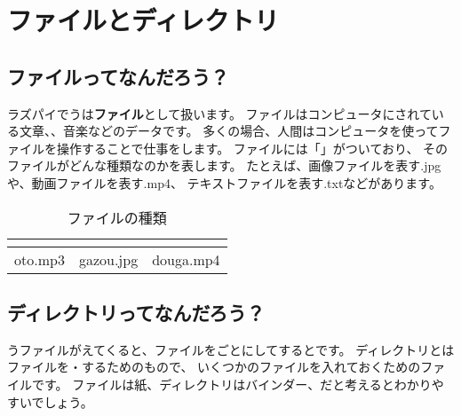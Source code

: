 \newpage
\section{ファイルとディレクトリ}
\subsection{ファイルってなんだろう？}
ラズパイでうは{\bf ファイル}として扱います。
ファイルはコンピュータにされている文章、、音楽などのデータです。
多くの場合、人間はコンピュータを使ってファイルを操作することで仕事をします。
ファイルには「」がついており、
そのファイルがどんな種類なのかを表します。
たとえば、画像ファイルを表す.jpgや、動画ファイルを表す.mp4、
テキストファイルを表す.txtなどがあります。


\begin{table}[H]
  \begin{center}
    \caption[tab:files]{ファイルの種類}
    \begin{tabular}{|c|c|c|} \hline
    \begin{minipage}{0.12\hsize}
      \begin{center}
        
      \end{center}  
    \end{minipage} & 
    \begin{minipage}{0.12\hsize}
      \begin{center}
        
      \end{center}
    \end{minipage} &
    \begin{minipage}{0.12\hsize}
      \begin{center}
        
      \end{center} 
    \end{minipage} \\ \hline
    oto.mp3 & gazou.jpg & douga.mp4 \\ \hline
  \end{tabular}
 \end{center}
\end{table}

\subsection{ディレクトリってなんだろう？}
うファイルがえてくると、ファイルをごとにしてするとです。
ディレクトリとはファイルを・するためのもので、
いくつかのファイルを入れておくためのファイルです。
ファイルは紙、ディレクトリはバインダー、だと考えるとわかりやすいでしょう。

